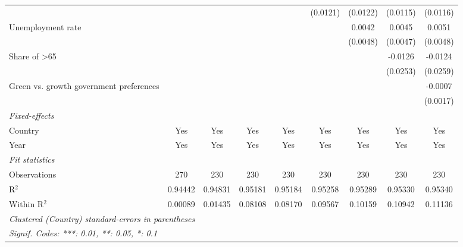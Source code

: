 \begin{table}[htbp]
\begin{tabular}{lcccccccc}
                                                             &          &          &                &                & (0.0121)       & (0.0122)       & (0.0115)       & (0.0116)\\   
      Unemployment rate                                      &          &          &                &                &                & 0.0042         & 0.0045         & 0.0051\\   
                                                             &          &          &                &                &                & (0.0048)       & (0.0047)       & (0.0048)\\   
      Share of >65                                           &          &          &                &                &                &                & -0.0126        & -0.0124\\   
                                                             &          &          &                &                &                &                & (0.0253)       & (0.0259)\\   
      Green vs. growth government preferences                &          &          &                &                &                &                &                & -0.0007\\   
                                                             &          &          &                &                &                &                &                & (0.0017)\\   
      \midrule
      \emph{Fixed-effects}\\
      Country                                                & Yes      & Yes      & Yes            & Yes            & Yes            & Yes            & Yes            & Yes\\  
      Year                                                   & Yes      & Yes      & Yes            & Yes            & Yes            & Yes            & Yes            & Yes\\  
      \midrule
      \emph{Fit statistics}\\
      Observations                                           & 270      & 230      & 230            & 230            & 230            & 230            & 230            & 230\\  
      R$^2$                                                  & 0.94442  & 0.94831  & 0.95181        & 0.95184        & 0.95258        & 0.95289        & 0.95330        & 0.95340\\  
      Within R$^2$                                           & 0.00089  & 0.01435  & 0.08108        & 0.08170        & 0.09567        & 0.10159        & 0.10942        & 0.11136\\  
      \midrule \midrule
      \multicolumn{9}{l}{\emph{Clustered (Country) standard-errors in parentheses}}\\
      \multicolumn{9}{l}{\emph{Signif. Codes: ***: 0.01, **: 0.05, *: 0.1}}\\
   \end{tabular}
\end{table}



